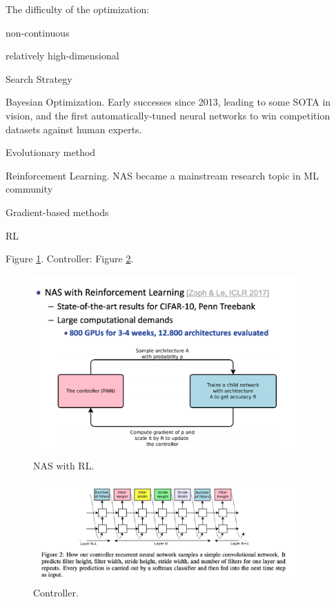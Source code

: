 \documentclass[english]{article}
\begin{document}
\item The difficulty of the optimization:

\benum 
\item non-continuous
\item relatively high-dimensional
\eenum 

\item Search Strategy

\benum 
\item Bayesian Optimization.
Early successes since 2013, leading to some SOTA in vision, and the first automatically-tuned neural networks to win competition datasets against human experts. 
\item
Evolutionary method
\item 
Reinforcement Learning.
NAS became a mainstream research topic in ML community
\item Gradient-based methods
\eenum 

\eenum 

\item RL

\benum 

\item Figure \ref{nas6}. Controller: Figure \ref{nas7}.

\begin{figure}[h!]
  \centering
  \includegraphics[width=0.9\textwidth]{nas6.png}
  \caption{NAS with RL.}
  \label{nas6}
\end{figure}


\begin{figure}[h!]
  \centering
  \includegraphics[width=0.9\textwidth]{nas7.png}
  \caption{Controller.}
  \label{nas7}
\end{figure}
\end{document}
